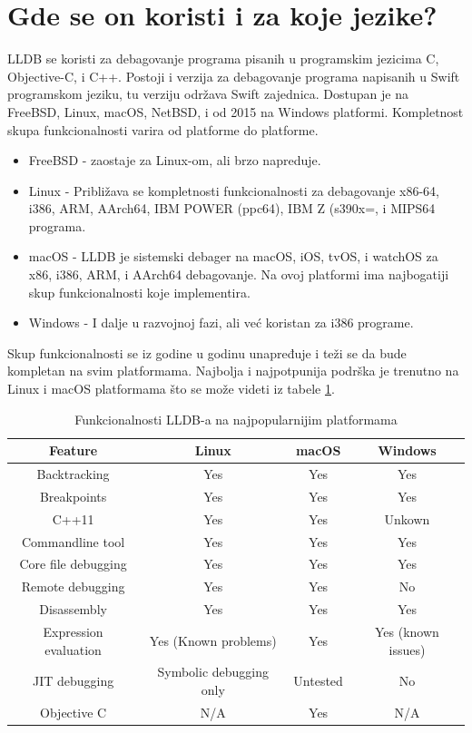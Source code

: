 \documentclass[a4paper]{article}
\begin{document}
\section{Gde se on koristi i za koje jezike? }
\label{sec: Gde se on koristi i za koje jezike?}
LLDB se koristi za debagovanje programa pisanih u programskim jezicima C, Objective-C, i C++. Postoji i verzija za debagovanje programa napisanih u Swift programskom jeziku, tu verziju održava Swift zajednica. 
Dostupan je na FreeBSD, Linux, macOS, NetBSD, i od 2015 na Windows platformi. Kompletnost skupa funkcionalnosti varira od platforme do platforme.
\begin{itemize}
\item FreeBSD - zaostaje za Linux-om, ali brzo napreduje.
\item Linux - Približava se kompletnosti funkcionalnosti za debagovanje x86-64, i386, ARM, AArch64, IBM POWER (ppc64), IBM Z (s390x=, i MIPS64 programa.
\item macOS - LLDB je sistemski debager na macOS, iOS, tvOS, i watchOS za x86, i386, ARM, i AArch64 debagovanje. Na ovoj platformi ima najbogatiji skup funkcionalnosti koje implementira.
\item Windows - I dalje u razvojnoj fazi, ali već koristan za i386 programe.
\end{itemize}
Skup funkcionalnosti se iz godine u godinu unapređuje i teži se da bude kompletan na svim platformama. Najbolja i najpotpunija podrška je trenutno na Linux i macOS platformama što se može videti iz tabele \ref{tab:table lldb features}.

\begin{table}[h!]
\center
\caption{Funkcionalnosti LLDB-a na najpopularnijim platformama}
\label{tab:table lldb features}
\begin{tabular}{|c|c c c|} 
 \hline
 Feature & Linux & macOS & Windows \\ [0.5ex] 
 \hline
 Backtracking & Yes & Yes & Yes \\ 
 Breakpoints & Yes & Yes & Yes \\
 C++11 & Yes & Yes & Unkown \\
 Commandline tool & Yes & Yes & Yes \\
 Core file debugging  & Yes & Yes & Yes \\
  Remote debugging & Yes & Yes & No\\ [1ex] 
 Disassembly & Yes & Yes & Yes  \\
 Expression evaluation & Yes (Known problems)& Yes & Yes (known issues) \\
 JIT debugging & Symbolic debugging only & Untested & No \\
 Objective C & N/A & Yes & N/A \\
 \hline
\end{tabular}
\end{table}
\end{document}
